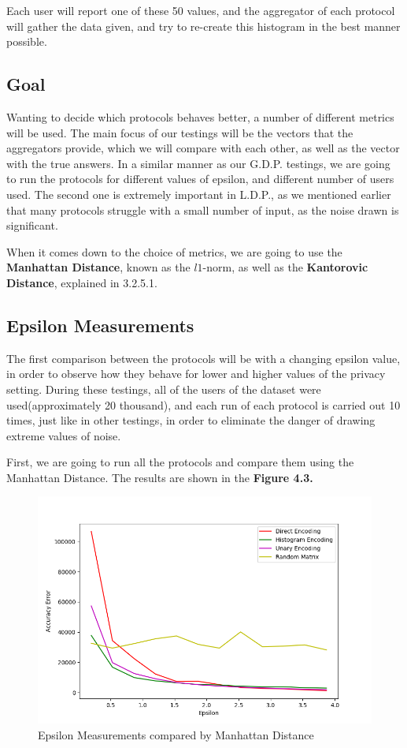 Each user will report one of these 50 values, and the aggregator of each protocol will gather the data given, and try to re-create this histogram in the best manner possible.

\subsection{Goal}

Wanting to decide which protocols behaves better, a number of different metrics will be used. The main focus of our testings will be the vectors that the aggregators provide, which we will compare with each other, as well as the vector with the true answers. In a similar manner as our G.D.P. testings, we are going to run the protocols for different values of epsilon, and different number of users used. The second one is extremely important in L.D.P., as we mentioned earlier that many protocols struggle with a small number of input, as the noise drawn is significant. 

When it comes down to the choice of metrics, we are going to use the \textbf{Manhattan Distance}, known as the $l1$-norm, as well as the \textbf{Kantorovic Distance}, explained in 3.2.5.1.

\subsection{Epsilon Measurements}

The first comparison between the protocols will be with a changing epsilon value, in order to observe how they behave for lower and higher values of the privacy setting. During these testings, all of the users of the dataset were used(approximately 20 thousand), and each run of each protocol is carried out 10 times, just like in other testings, in order to eliminate the danger of drawing extreme values of noise.

First, we are going to run all the protocols and compare them using the Manhattan Distance. The results are shown in the \textbf{Figure 4.3.}


\begin{figure}[!htb]\centering
    \includegraphics[width=1\textwidth]{images/epsilon_others_l1.png}
    \caption{Epsilon Measurements compared by Manhattan Distance}
\end{figure}


